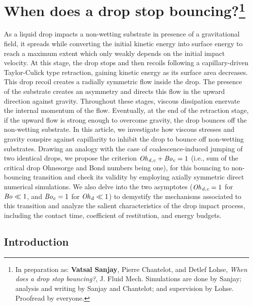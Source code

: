 \chapter[When does a drop stop bouncing?]{When does a drop stop bouncing?\footnote{In preparation as: \textbf{Vatsal Sanjay}, Pierre Chantelot, and Detlef Lohse, \textit{When does a drop stop bouncing?}, J. Fluid Mech. Simulations are done by Sanjay; analysis and writing by Sanjay and Chantelot; and supervision by Lohse. Proofread by everyone.}}
\label{chap:DropViscousBouncing}

As a liquid drop impacts a non-wetting substrate in presence of a gravitational field, it spreads while converting the initial kinetic energy into surface energy to reach a maximum extent which only weakly depends on the initial impact velocity. At this stage, the drop stops and then recoils following a capillary-driven Taylor-Culick type retraction, gaining kinetic energy as its surface area decreases. This drop recoil creates a radially symmetric flow inside the drop. The presence of the substrate creates an asymmetry and directs this flow in the upward direction against gravity. Throughout these stages, viscous dissipation enervate the internal momentum of the flow. Eventually, at the end of the retraction stage, if the upward flow is strong enough to overcome gravity, the drop bounces off the non-wetting substrate. In this article, we investigate how viscous stresses and gravity conspire against capillarity to inhibit the drop to bounce off non-wetting substrates. Drawing an analogy with the case of coalescence-induced jumping of two identical drops, we propose the criterion $\mathit{Oh}_\mathit{d,c} + \mathit{Bo}_\mathit{c} = 1$ (i.e., sum of the critical drop Ohnesorge and Bond numbers being one), for this bouncing to non-bouncing transition and check its validity by employing axially symmetric direct numerical simulations. We also delve into the two asymptotes ($\mathit{Oh}_\mathit{d,c} = 1$ for $\mathit{Bo} \ll 1$, and $\mathit{Bo}_\mathit{c} = 1$ for $\mathit{Oh}_\mathit{d} \ll 1$) to demystify the mechanisms associated to this transition and analyze the salient characteristics of the drop impact process, including the contact time, coefficient of restitution, and energy budgets.

\clearpage

\section{Introduction}
\label{Ch3::sec:Intro}

